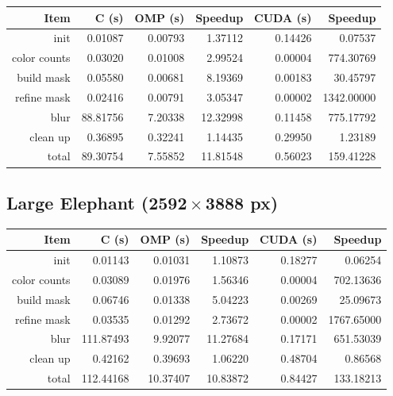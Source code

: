 \documentclass[12pt]{article}
\begin{document}
\begin{tabular}{r|r|r|r|r|r}
    Item & C (s) & OMP (s) & Speedup & CUDA (s) & Speedup
\\  \hline
    init & 0.01087 & 0.00793 & 1.37112 & 0.14426 & 0.07537
\\  color counts & 0.03020 & 0.01008 & 2.99524 & 0.00004 & 774.30769
\\  build mask & 0.05580 & 0.00681 & 8.19369 & 0.00183 & 30.45797
\\  refine mask & 0.02416 & 0.00791 & 3.05347 & 0.00002 & 1342.00000
\\  blur & 88.81756 & 7.20338 & 12.32998 & 0.11458 & 775.17792
\\  clean up & 0.36895 & 0.32241 & 1.14435 & 0.29950 & 1.23189
\\  \hline
    total & 89.30754 & 7.55852 & 11.81548 & 0.56023 & 159.41228
\end{tabular}

\subsection{Large Elephant ($\mathbf{2592 \times 3888}$ px)}

\begin{tabular}{r|r|r|r|r|r}
    Item & C (s) & OMP (s) & Speedup & CUDA (s) & Speedup
\\  \hline
    init & 0.01143 & 0.01031 & 1.10873 & 0.18277 & 0.06254
\\  color counts & 0.03089 & 0.01976 & 1.56346 & 0.00004 & 702.13636
\\  build mask & 0.06746 & 0.01338 & 5.04223 & 0.00269 & 25.09673
\\  refine mask & 0.03535 & 0.01292 & 2.73672 & 0.00002 & 1767.65000
\\  blur & 111.87493 & 9.92077 & 11.27684 & 0.17171 & 651.53039
\\  clean up & 0.42162 & 0.39693 & 1.06220 & 0.48704 & 0.86568
\\  \hline
    total & 112.44168 & 10.37407 & 10.83872 & 0.84427 & 133.18213
\end{tabular}
\end{document}
